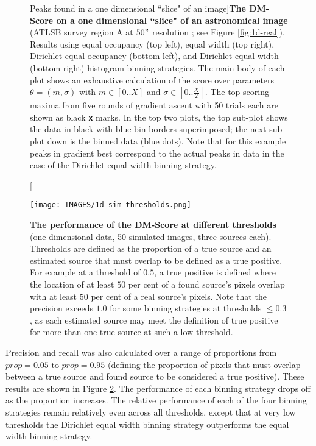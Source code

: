 \begin{figure}
\centering
{}
\caption[Peaks found in a one dimensional ``slice" of an image]{\textbf{The DM-Score on a one dimensional ``slice" of an astronomical image} (ATLSB survey region A at $50"$ resolution \cite{saripalli2012atlbs,subrahmanyan2010atlbs}; see Figure \ref{fig:1d-real}). Results using equal occupancy (top left), equal width (top right), Dirichlet equal occupancy (bottom left), and Dirichlet equal width (bottom right) histogram binning strategies. The main body of each plot shows an exhaustive calculation of the score over parameters $\theta = (m, \sigma)$ with $m \in [0 .. X]$ and $\sigma \in [0 .. \frac{X}{2}]$. The top scoring maxima from five rounds of gradient ascent with 50 trials each are shown as black \texttt{\textbf{x}} marks. In the top two plots, the top sub-plot shows the data in black with blue bin borders superimposed; the next sub-plot down is the binned data (blue dots). Note that for this example peaks in gradient best correspond to the actual peaks in data in the case of the Dirichlet equal width binning strategy.}
\label{fig:1d-comp-binning}
\end{figure}

\begin{figure}
\centering
\texttt{[image: IMAGES/1d-sim-thresholds.png]}
\caption[The DM-Score on at different thresholds (1D)]{\textbf{The performance of the DM-Score at different thresholds} (one dimensional data, 50 simulated images, three sources each). Thresholds are defined as the proportion of a true source and an estimated source that must overlap to be defined as a true positive. For example at a threshold of $0.5$, a true positive is defined where the location of at least $50$ per cent of a found source's pixels overlap with at least $50$ per cent of a real source's pixels. Note that the precision exceeds $1.0$ for some binning strategies at thresholds $\le 0.3$, as each estimated source may meet the definition of true positive for more than one true source at such a low threshold.}
\label{fig:1d-sim-thresholds}
\end{figure}

Precision and recall was also calculated over a range of proportions from $prop=0.05$ to $prop=0.95$ (defining the proportion of pixels that must overlap between a true source and found source to be considered a true positive). These results are shown in Figure \ref{fig:1d-sim-thresholds}. The performance of each binning strategy drops off as the proportion increases. The relative performance of each of the four binning strategies remain relatively even across all thresholds, except that at very low thresholds the Dirichlet equal width binning strategy outperforms the equal width binning strategy.

